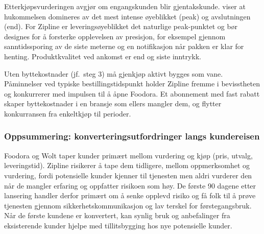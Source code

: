 Etterkjøpsvurderingen avgjør om engangskunden blir gjentakskunde.
\textcite{kahnemanriis2005} viser at hukommelsen domineres av det mest
intense øyeblikket (peak) og avslutningen (end). For Zipline er
leveringsøyeblikket det naturlige peak-punktet og bør designes for å
forsterke opplevelsen av presisjon, for eksempel gjennom sanntidssporing av
de siste meterne og en notifikasjon når pakken er klar for henting.
Produktkvalitet ved ankomst er end og siste inntrykk.

Uten byttekostnader (jf.\ steg 3) må gjenkjøp aktivt bygges som vane.
Påminnelser ved typiske bestillingstidspunkt holder Zipline fremme i
bevisstheten og konkurrerer med impulsen til å åpne Foodora. Et abonnement
med fast rabatt skaper byttekostnader i en bransje som ellers mangler dem,
og flytter konkurransen fra enkeltkjøp til perioder.

\subsubsection{Oppsummering: konverteringsutfordringer langs kundereisen}

Foodora og Wolt taper kunder primært mellom vurdering og kjøp (pris,
utvalg, leveringstid). Zipline risikerer å tape dem tidligere, mellom
oppmerksomhet og vurdering, fordi potensielle kunder kjenner til tjenesten
men aldri vurderer den når de mangler erfaring og oppfatter risikoen som
høy.
De første 90 dagene etter lansering handler derfor primært om å senke
opplevd risiko og få folk til å prøve tjenesten gjennom
sikkerhetskommunikasjon og lav terskel for førstegangsbruk. Når de første
kundene er konvertert, kan synlig bruk og anbefalinger fra eksisterende
kunder hjelpe med tillitsbygging hos nye potensielle kunder.
